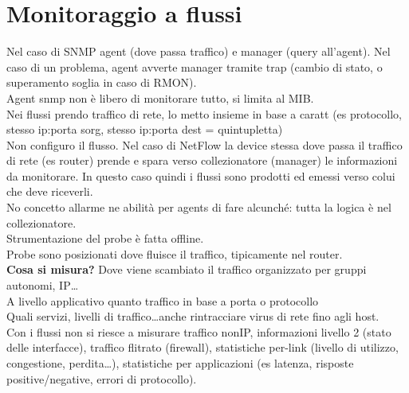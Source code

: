 \documentclass[10pt]{book}
\begin{document}
\section{Monitoraggio a flussi}
Nel caso di SNMP agent (dove passa traffico) e manager (query all'agent). Nel caso di un problema, agent avverte manager tramite trap (cambio di stato, o superamento soglia in caso di RMON).\\
Agent snmp non è libero di monitorare tutto, si limita al MIB.\\
Nei flussi prendo traffico di rete, lo metto insieme in base a caratt (es protocollo, stesso ip:porta sorg, stesso ip:porta dest = quintupletta)\\
Non configuro il flusso. Nel caso di NetFlow la device stessa dove passa il traffico di rete (es router) prende e spara verso collezionatore (manager) le informazioni da monitorare. In questo caso quindi i flussi sono prodotti ed emessi verso colui che deve riceverli.\\
No concetto allarme ne abilità per agents di fare alcunché: tutta la logica è nel collezionatore.\\
Strumentazione del probe è fatta offline.\\
Probe sono posizionati dove fluisce il traffico, tipicamente nel router.\\
\textbf{Cosa si misura?} Dove viene scambiato il traffico organizzato per gruppi autonomi, IP\ldots\\
A livello applicativo quanto traffico in base a porta o protocollo\\
Quali servizi, livelli di traffico\ldots anche rintracciare virus di rete fino agli host.\\
Con i flussi non si riesce a misurare traffico nonIP, informazioni livello 2 (stato delle interfacce), traffico flitrato (firewall), statistiche per-link (livello di utilizzo, congestione, perdita\ldots), statistiche per applicazioni (es latenza, risposte positive/negative, errori di protocollo).
\end{document}
